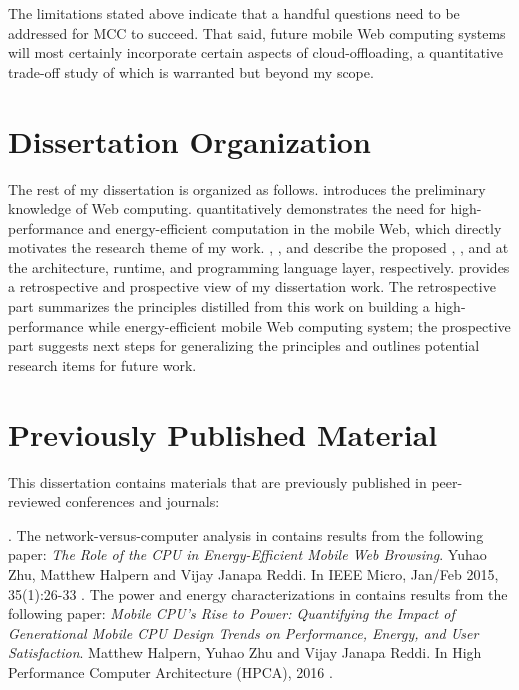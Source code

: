 The limitations stated above indicate that a handful questions need to be addressed for MCC to succeed. That said, future mobile Web computing systems will most certainly incorporate certain aspects of cloud-offloading, a quantitative trade-off study of which is warranted but beyond my scope.

\section{Dissertation Organization}
\label{sec:intro:outline}

The rest of my dissertation is organized as follows.  introduces the preliminary knowledge of Web computing.  quantitatively demonstrates the need for high-performance and energy-efficient computation in the mobile Web, which directly motivates the research theme of my work. , , and  describe the proposed \webcore, \webrt, and \greenweb at the architecture, runtime, and programming language layer, respectively.  provides a retrospective and prospective view of my dissertation work. The retrospective part summarizes the principles distilled from this work on building a high-performance while energy-efficient mobile Web computing system; the prospective part suggests next steps for generalizing the principles and outlines potential research items for future work.

\section{Previously Published Material}
\label{sec:intro:prev}

This dissertation contains materials that are previously published in peer-reviewed conferences and journals:

\textbf{}. The network-versus-computer analysis in  contains results from the following paper: \textit{The Role of the CPU in Energy-Efficient Mobile Web Browsing}. Yuhao Zhu, Matthew Halpern and Vijay Janapa Reddi. In IEEE Micro, Jan/Feb 2015, 35(1):26-33 \cite{zhu2015role}. The power and energy characterizations in  contains results from the following paper: \textit{Mobile CPU's Rise to Power: Quantifying the Impact of Generational Mobile CPU Design Trends on Performance, Energy, and User Satisfaction}. Matthew Halpern, Yuhao Zhu and Vijay Janapa Reddi. In High Performance Computer Architecture (HPCA), 2016 \cite{mobilecpu}.

